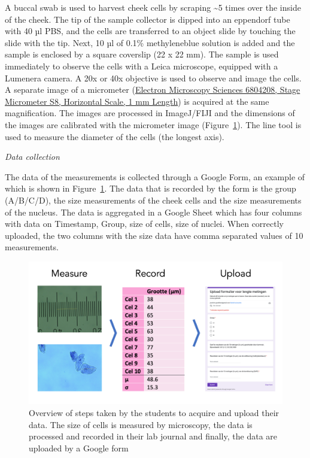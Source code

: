 \documentclass[
]{agujournal2019}
\begin{document}
A buccal swab is used to harvest cheek cells by scraping
\textasciitilde5 times over the inside of the cheek. The tip of the
sample collector is dipped into an eppendorf tube with 40 µl PBS, and
the cells are transferred to an object slide by touching the slide with
the tip. Next, 10 µl of 0.1\% methyleneblue solution is added and the
sample is enclosed by a square coverslip (22 x 22 mm). The sample is
used immediately to observe the cells with a Leica microscope, equipped
with a Lumenera camera. A 20x or 40x objective is used to observe and
image the cells. A separate image of a micrometer
(\href{https://www.fishersci.com/shop/products/stage-graticules-s8/5028481}{Electron
Microscopy Sciences 6804208, Stage Micrometer S8, Horizontal Scale, 1 mm
Length}) is acquired at the same magnification. The images are processed
in ImageJ/FIJI and the dimensions of the images are calibrated with the
micrometer image (Figure~\ref{fig-students-side}). The line tool is used
to measure the diameter of the cells (the longest axis).

\emph{Data collection}

The data of the measurements is collected through a Google Form, an
example of which is shown in Figure~\ref{fig-students-side}. The data
that is recorded by the form is the group (A/B/C/D), the size
measurements of the cheek cells and the size measurements of the
nucleus. The data is aggregated in a Google Sheet which has four columns
with data on Timestamp, Group, size of cells, size of nuclei. When
correctly uploaded, the two columns with the size data have comma
separated values of 10 measurements.

\begin{figure}

{\centering \includegraphics{images/Students-side.png}

}

\caption{\label{fig-students-side}Overview of steps taken by the
students to acquire and upload their data. The size of cells is measured
by microscopy, the data is processed and recorded in their lab journal
and finally, the data are uploaded by a Google form}

\end{figure}
\end{document}

